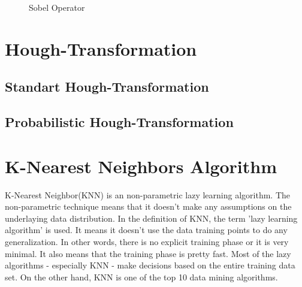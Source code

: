 \begin{figure}[H]
  \centering
  \hfill
  \caption{Sobel Operator\cite{Sobel_Operator}}
\end{figure}




%
\section{Hough-Transformation}\label{sec:Hough-Transformation}
%

%
\subsection{Standart Hough-Transformation}\label{sec:Standart Hough - Transformation}
%


%
\subsection{Probabilistic Hough-Transformation}\label{sec:Probabilistic Hough-Transformation}
%




%
\section{K-Nearest Neighbors Algorithm}\label{sec:K-Nearest Neighbors Algorithm}
%
K-Nearest Neighbor(KNN) is an non-parametric lazy learning algorithm. The non-parametric technique means that it doesn't make any assumptions on the underlaying data distribution. In the definition of KNN, the term 'lazy learning algorithm' is used. It means it doesn't use the data training points to do any generalization. In other words, there is no explicit training phase or it is very minimal.  It also means that the training phase is pretty fast. Most of the lazy algorithms - especially KNN - make decisions based on the entire training data set. On the other hand, KNN is one of the top 10 data mining algorithms\cite{k_nearest_neighbors}.

